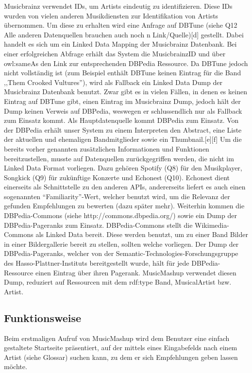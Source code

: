 Musicbrainz verwendet IDs, um Artists eindeutig zu identifizieren. Diese IDs wurden von vielen anderen Musikdiensten zur Identifikation von Artists übernommen. Um diese zu erhalten wird eine Anfrage auf DBTune (siehe Q12 Alle anderen Datenquellen brauchen auch noch n Link/Quelle)[d] gestellt. Dabei handelt es sich um ein Linked Data Mapping der Musicbrainz Datenbank. Bei einer erfolgreichen Abfrage erhält das System die MusicbrainzID und über owl:sameAs den Link zur entsprechenden DBPedia Ressource. Da DBTune jedoch nicht vollständig ist (zum Beispiel enthält DBTune keinen Eintrag für die Band ,,Them Crooked Vultures''), wird als Fallback ein Linked Data Dump der Musicbrainz Datenbank benutzt. Zwar gibt es in vielen Fällen, in denen es keinen Eintrag auf DBTune gibt, einen Eintrag im Musicbrainz Dump, jedoch hält der Dump keinen Verweis auf DBPedia, weswegen er schlussendlich nur als Fallback zum Einsatz kommt.
Als Hauptdatenquelle kommt DBPedia zum Einsatz. Von der DBPedia erhält unser System zu einem Interpreten den Abstract, eine Liste der aktuellen und ehemaligen Bandmitglieder sowie ein Thumbnail.[e][f]
Um die bereits vorher genannten zusätzlichen Informationen und Funktionen bereitzustellen, musste auf Datenquellen zurückgegriffen werden, die nicht im Linked Data Format vorliegen. Dazu gehören Spotify (Q8) für den Musikplayer, Songkick (Q9) für zukünftige Konzerte und Echonest (Q10). Echonest dient einerseits als Schnittstelle zu den anderen APIs, andererseits liefert es auch einen sogenannten “Familiarity”-Wert, welcher benutzt wird, um die Relevanz der gefunden Empfehlungen zu bewerten (dazu später mehr).
Weiterhin kommen die DBPedia-Commons (siehe http://commons.dbpedia.org/) sowie ein Dump der DBPedia-Pageranks zum Einsatz. DBPedia-Commons stellt die Wikimedia-Commons als Linked Data bereit. Diese werden benutzt, um zu einer Band Bilder in einer Bildergallerie bereit zu stellen, sollten welche vorliegen. 
Der Dump der DBPedia-Pageranks, welcher von der Semantic-Technologies-Forschungsgruppe des Hasso-Plattner-Instituts bereitgestellt wurde, hält für jede DBPedia-Ressource einen Eintrag über ihren Pagerank. MusicMashup verwendet diesen Dump, reduziert auf Ressourcen mit dem rdf:type Band, MusicalArtist bzw. Artist.

\subsection{Funktionsweise}


Beim erstmaligen Aufruf von MusicMashup wird dem Benutzer eine einfach gestaltete Startseite präsentiert, auf der mittels eines Eingabefelds nach einem Artist (siehe Glossar) suchen kann, zu dem er sich Empfehlungen geben lassen möchte.


